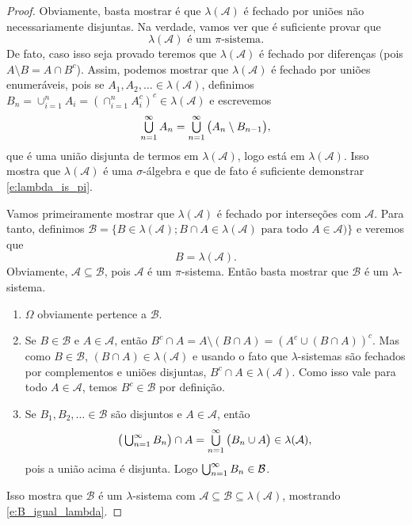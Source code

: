\documentclass[../main/Notas_de_aula.tex]{subfiles}
\begin{document}
\begin{proof}
  Obviamente, basta mostrar é que $\lambda(\mathcal{A})$ é fechado por uniões não necessariamente disjuntas.
  Na verdade, vamos ver que é suficiente provar que
  \begin{equation}
    \label{e:lambda_is_pi}
    \lambda(\mathcal{A}) \text{ é um $\pi$-sistema}.
  \end{equation}
  De fato, caso isso seja provado teremos que $\lambda(\mathcal{A})$ é fechado por diferenças (pois $A \setminus B = A \cap B^c$).
  Assim, podemos mostrar que $\lambda(\mathcal{A})$ é fechado por uniões enumeráveis, pois se $A_1, A_2, \dots \in \lambda(\mathcal{A})$, definimos $B_n = \cup_{i=1}^n A_i = (\cap_{i=1}^n A_i^c)^c \in \lambda(\mathcal{A})$ e escrevemos
  \begin{equation}
    \operatorname*{{\textstyle \bigcup}}_{n=1}^{\infty} A_n = \operatorname*{{\textstyle \bigcup}}_{n=1}^{\infty} \big(A_n \setminus B_{n-1} \big),
  \end{equation}
  que é uma união disjunta de termos em $\lambda(\mathcal{A})$, logo está em $\lambda(\mathcal{A})$.
  Isso mostra que $\lambda(\mathcal{A})$ é uma $\sigma$-álgebra e que de fato é suficiente demonstrar \eqref{e:lambda_is_pi}.

  Vamos primeiramente mostrar que $\lambda(\mathcal{A})$ é fechado por interseções com $\mathcal{A}$.
  Para tanto, definimos $\mathcal{B} = \big\{B \in \lambda(\mathcal{A}); \text{$B \cap A \in \lambda(\mathcal{A})$ para todo $A \in \mathcal{A}$})\big\}$ e veremos que
  \begin{equation}
    \label{e:B_igual_lambda}
    B = \lambda(\mathcal{A}).
  \end{equation}
  Obviamente, $\mathcal{A} \subseteq \mathcal{B}$, pois $\mathcal{A}$ é um $\pi$-sistema.
  Então basta mostrar que $\mathcal{B}$ é um $\lambda$-sistema.
  \begin{enumerate}[\quad a)]
  \item $\Omega$ obviamente pertence a $\mathcal{B}$.
  \item Se $B \in \mathcal{B}$ e $A \in \mathcal{A}$, então $B^c \cap A = A \setminus(B \cap A) = (A^c \cup (B \cap A))^c$.
    Mas como $B \in \mathcal{B}$, $(B \cap A) \in \lambda(\mathcal{A})$ e usando o fato que $\lambda$-sistemas são fechados por complementos e uniões disjuntas, $B^c \cap A \in \lambda(\mathcal{A})$.
    Como isso vale para todo $A \in \mathcal{A}$, temos $B^c \in \mathcal{B}$ por definição.
  \item Se $B_1, B_2, \dots \in \mathcal{B}$ são disjuntos e $A \in \mathcal{A}$, então
    \begin{equation}
      \big(\operatorname*{{\textstyle \bigcup}}\nolimits_{n=1}^{\infty} B_n \big) \cap A = \operatorname*{{\textstyle \bigcup}}_{n=1}^{\infty} \big(B_n \cup A\big) \in \lambda(\mathcal{A}),
    \end{equation}
    pois a união acima é disjunta.
    Logo $\operatorname*{{\textstyle \bigcup}}_{n=1}^{\infty} B_n \in \mathcal{B}$.
  \end{enumerate}
  Isso mostra que $\mathcal{B}$ é um $\lambda$-sistema com $\mathcal{A} \subseteq \mathcal{B} \subseteq \lambda(\mathcal{A})$, mostrando \eqref{e:B_igual_lambda}.


\end{proof}
\end{document}
